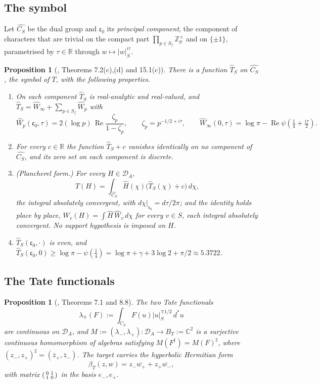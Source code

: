 \documentclass[11pt]{amsart}
\newtheorem{proposition}[theorem]{Proposition}
\theoremstyle{definition}
\theoremstyle{remark}
\newcommand{\C}{\mathbb C}
\newcommand{\R}{\mathbb R}
\newcommand{\Z}{\mathbb Z}
\newcommand{\Rel}{\operatorname{Re}}
\newcommand{\DA}{\mathcal D_A}
\newcommand{\CS}{C_S}
\newcommand{\cz}{\mathfrak c_0}
\newcommand{\BT}{B_T}
\begin{document}
\subsection{The symbol}

Let $\widehat{\CS}$ be the dual group and $\cz$ its \emph{principal component},
the component of characters that are trivial on the compact part
$\prod_{p\in S_f}\Z_p^\times$ and on $\{\pm1\}$, parametrised by
$\tau\in\R$ through $w\mapsto|w|_S^{i\tau}$.

\begin{proposition}[\cite{P43}, Theorems 7.2(c),(d) and 15.1(c)]
\label{prop:symbol}
There is a function $\widehat T_S$ on $\widehat{\CS}$, the \emph{symbol} of
$T$, with the following properties.
\begin{enumerate}
\item[(a)] On each component $\widehat T_S$ is real-analytic and real-valued,
and $\widehat T_S=\widehat W_\infty+\sum_{p\in S_f}\widehat W_p$ with
\[
  \widehat W_p(\cz,\tau)=2(\log p)\,\Rel\frac{\zeta_p}{1-\zeta_p},\qquad
  \zeta_p=p^{-1/2+i\tau},\qquad
  \widehat W_\infty(0,\tau)=\log\pi-\Rel\psi(\tfrac14+\tfrac{i\tau}2).
  \tag{2.5}
\]
\item[(b)] For every $c\in\R$ the function $\widehat T_S+c$ vanishes
identically on \emph{no} component of $\widehat{\CS}$, and its zero set on each
component is discrete.
\item[(c)] \emph{(Plancherel form.)}  For every $H\in\DA$,
\[
  T(H)=\int_{\widehat{\CS}}\widehat H(\chi)\bigl(\widehat T_S(\chi)+c\bigr)\,d\chi,
  \tag{2.6}
\]
the integral absolutely convergent, with $d\chi|_{\cz}=d\tau/2\pi$; and the
identity holds place by place, $W_v(H)=\int\widehat H\,\widehat W_v\,d\chi$
for every $v\in S$, each integral absolutely convergent.  No support hypothesis
is imposed on $H$.
\item[(d)] $\widehat T_S(\cz,\cdot)$ is even, and
$\widehat T_S(\cz,0)\ge\log\pi-\psi(\tfrac14)=\log\pi+\gamma+3\log2+\pi/2
\approx5.3722$.
\end{enumerate}
\end{proposition}

\subsection{The Tate functionals}

\begin{proposition}[\cite{P43}, Theorems 7.1 and 8.8]
\label{prop:tate}
The two \emph{Tate functionals}
\[
  \lambda_\mp(F):=\int_{\CS}F(u)|u|_S^{\mp1/2}\,d^*u
  \tag{2.7}
\]
are continuous on $\DA$, and $M:=(\lambda_-,\lambda_+)\colon\DA\to\BT:=\C^2$ is
a surjective continuous homomorphism of algebras satisfying
$M(F^\dagger)=M(F)^\sharp$, where $(z_-,z_+)^\sharp=(\bar z_+,\bar z_-)$.  The
target carries the hyperbolic Hermitian form
\[
  \beta_T(z,w)=z_-\overline{w_+}+z_+\overline{w_-},
  \tag{2.8}
\]
with matrix $\begin{psmallmatrix}0&1\\1&0\end{psmallmatrix}$ in the basis
$e_-,e_+$.
\end{proposition}
\end{document}
